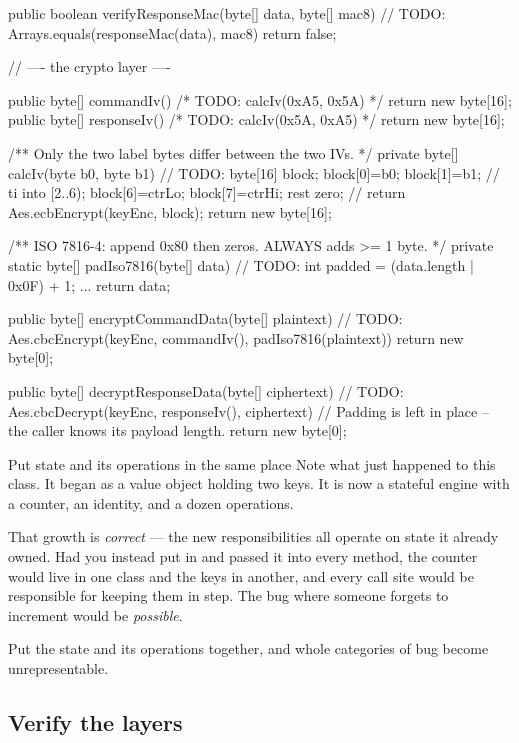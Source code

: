 \begin{jcode}
    public boolean verifyResponseMac(byte[] data, byte[] mac8) {
        // TODO: Arrays.equals(responseMac(data), mac8)
        return false;
    }

    // ---- the crypto layer ----

    public byte[] commandIv()  { /* TODO: calcIv(0xA5, 0x5A) */ return new byte[16]; }
    public byte[] responseIv() { /* TODO: calcIv(0x5A, 0xA5) */ return new byte[16]; }

    /** Only the two label bytes differ between the two IVs. */
    private byte[] calcIv(byte b0, byte b1) {
        // TODO: byte[16] block; block[0]=b0; block[1]=b1;
        //       ti into [2..6); block[6]=ctrLo; block[7]=ctrHi; rest zero;
        //       return Aes.ecbEncrypt(keyEnc, block);
        return new byte[16];
    }

    /** ISO 7816-4: append 0x80 then zeros. ALWAYS adds >= 1 byte. */
    private static byte[] padIso7816(byte[] data) {
        // TODO: int padded = (data.length | 0x0F) + 1; ...
        return data;
    }

    public byte[] encryptCommandData(byte[] plaintext) {
        // TODO: Aes.cbcEncrypt(keyEnc, commandIv(), padIso7816(plaintext))
        return new byte[0];
    }

    public byte[] decryptResponseData(byte[] ciphertext) {
        // TODO: Aes.cbcDecrypt(keyEnc, responseIv(), ciphertext)
        //   Padding is left in place -- the caller knows its payload length.
        return new byte[0];
    }
\end{jcode}

\begin{concept}{Put state and its operations in the same place}
Note what just happened to this class. It began as a value object holding two
keys. It is now a stateful engine with a counter, an identity, and a dozen
operations.

That growth is \emph{correct} --- the new responsibilities all operate on state it
already owned. Had you instead put  in  and
passed it into every method, the counter would live in one class and the keys in
another, and every call site would be responsible for keeping them in step. The
bug where someone forgets to increment would be \emph{possible}.

Put the state and its operations together, and whole categories of bug become
unrepresentable.
\end{concept}

\subsection{Verify the layers}

